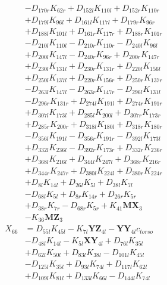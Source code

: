 \begin{multicols}{2}
\begin{align}
&- D_{170r}K_{62r} + D_{152l}K_{110l} + D_{152r}K_{110r}  \nonumber \\
&+ D_{179l}K_{96l} + D_{161l}K_{117l} + D_{179r}K_{96r}  \nonumber \\
&+ D_{188l}K_{101l} + D_{161r}K_{117r} + D_{188r}K_{101r}  \nonumber \\
&- D_{210l}K_{110l} - D_{210r}K_{110r} - D_{240l}K_{96l}  \nonumber \\
&+ D_{200l}K_{147l} - D_{240r}K_{96r} + D_{200r}K_{147r}  \nonumber \\
&+ D_{230l}K_{131l} + D_{230r}K_{131r} + D_{220l}K_{156l}  \nonumber \\
&+ D_{250l}K_{137l} + D_{220r}K_{156r} + D_{250r}K_{137r}  \nonumber \\
&- D_{263l}K_{147l} - D_{263r}K_{147r} - D_{296l}K_{131l}  \nonumber \\
&- D_{296r}K_{131r} + D_{274l}K_{191l} + D_{274r}K_{191r}  \nonumber \\
&+ D_{307l}K_{173l} + D_{285l}K_{200l} + D_{307r}K_{173r}  \nonumber \\
&+ D_{285r}K_{200r} + D_{318l}K_{180l} + D_{318r}K_{180r}  \nonumber \\
&- D_{356l}K_{191l} - D_{356r}K_{191r} - D_{392l}K_{173l}  \nonumber \\
&+ D_{332l}K_{236l} - D_{392r}K_{173r} + D_{332r}K_{236r}  \nonumber \\
&+ D_{368l}K_{216l} + D_{344l}K_{247l} + D_{368r}K_{216r}  \nonumber \\
&+ D_{344r}K_{247r} + D_{380l}K_{224l} + D_{380r}K_{224r}  \nonumber \\
&+ D_{8l}K_{14l} + D_{26l}K_{5l} + D_{38l}K_{7l}  \nonumber \\
&- D_{68l}K_{5l} + D_{8r}K_{14r} + D_{26r}K_{5r}  \nonumber \\
&+ D_{38r}K_{7r} - D_{68r}K_{5r} + K_{41}\mathbf{MX}_3  \nonumber \\
&- K_{36}\mathbf{MZ}_3 \nonumber \\
X_{66} &= D_{55l}K_{45l} - K_{7l}\mathbf{YZ}_{4l} - \mathbf{YY}_{4l}c_{torso}  \nonumber \\
&- D_{48l}K_{14l} - K_{5l}\mathbf{XY}_{4l} + D_{76l}K_{35l}  \nonumber \\
&+ D_{62l}K_{50l} + D_{83l}K_{38l} - D_{101l}K_{45l}  \nonumber \\
&- D_{125l}K_{35l} + D_{93l}K_{74l} + D_{117l}K_{62l}  \nonumber \\
&+ D_{109l}K_{81l} + D_{133l}K_{66l} - D_{144l}K_{74l}  \nonumber \\

\end{align}
\end{multicols}
